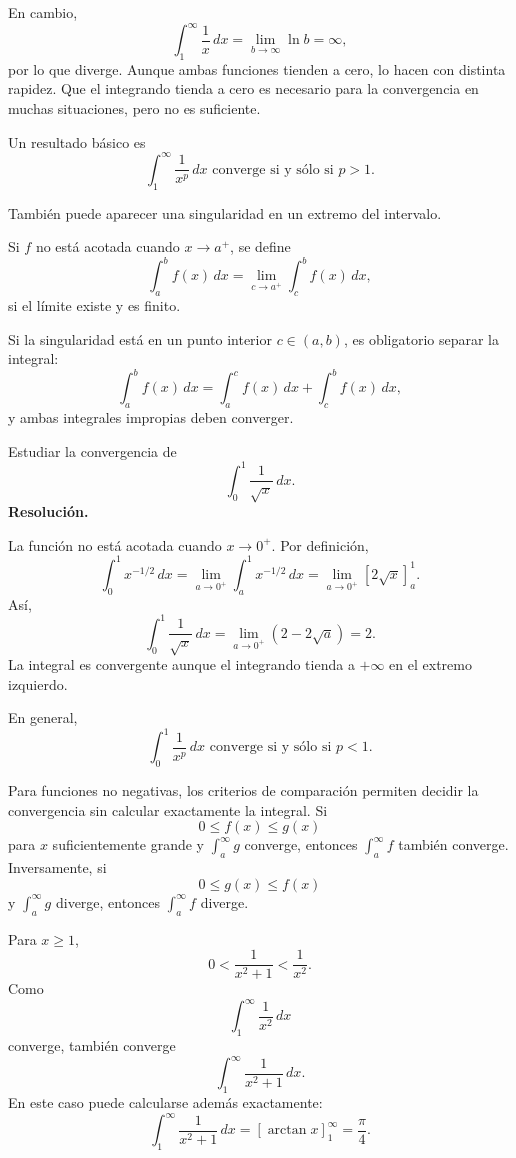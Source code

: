 En cambio,
\[
\int_1^{\infty}\frac1x\,dx
=
\lim_{b\to\infty}\ln b
=\infty,
\]
por lo que diverge. Aunque ambas funciones tienden a cero, lo hacen con distinta rapidez. Que el integrando tienda a cero es necesario para la convergencia en muchas situaciones, pero no es suficiente.

Un resultado básico es
\[
\boxed{\int_1^{\infty}\frac{1}{x^p}\,dx
\text{ converge si y sólo si }p>1.}
\]

También puede aparecer una singularidad en un extremo del intervalo.

\begin{definition}
Si $f$ no está acotada cuando $x\to a^+$, se define
\[
\int_a^b f(x)\,dx
=
\lim_{c\to a^+}\int_c^b f(x)\,dx,
\]
si el límite existe y es finito.
\end{definition}

Si la singularidad está en un punto interior $c\in(a,b)$, es obligatorio separar la integral:
\[
\int_a^b f(x)\,dx
=
\int_a^c f(x)\,dx+
\int_c^b f(x)\,dx,
\]
y ambas integrales impropias deben converger.

\begin{solvedexercise}
Estudiar la convergencia de
\[
\int_0^1\frac{1}{\sqrt{x}}\,dx.
\]
\tcblower
\textbf{Resolución.}\par\smallskip
La función no está acotada cuando $x\to0^+$. Por definición,
\[
\int_0^1x^{-1/2}\,dx
=
\lim_{a\to0^+}\int_a^1x^{-1/2}\,dx
=
\lim_{a\to0^+}\left[2\sqrt{x}\right]_a^1.
\]
Así,
\[
\int_0^1\frac{1}{\sqrt{x}}\,dx
=
\lim_{a\to0^+}(2-2\sqrt a)=2.
\]
La integral es convergente aunque el integrando tienda a $+\infty$ en el extremo izquierdo.
\end{solvedexercise}

En general,
\[
\boxed{\int_0^1\frac{1}{x^p}\,dx
\text{ converge si y sólo si }p<1.}
\]

Para funciones no negativas, los criterios de comparación permiten decidir la convergencia sin calcular exactamente la integral. Si
\[
0\leq f(x)\leq g(x)
\]
para $x$ suficientemente grande y $\int_a^\infty g$ converge, entonces $\int_a^\infty f$ también converge. Inversamente, si
\[
0\leq g(x)\leq f(x)
\]
y $\int_a^\infty g$ diverge, entonces $\int_a^\infty f$ diverge.

\begin{example}
Para $x\geq1$,
\[
0<\frac{1}{x^2+1}<\frac{1}{x^2}.
\]
Como
\[
\int_1^{\infty}\frac{1}{x^2}\,dx
\]
converge, también converge
\[
\int_1^{\infty}\frac{1}{x^2+1}\,dx.
\]
En este caso puede calcularse además exactamente:
\[
\int_1^{\infty}\frac{1}{x^2+1}\,dx
=
\left[\arctan x\right]_1^{\infty}
=
\frac{\pi}{4}.
\]
\end{example}

